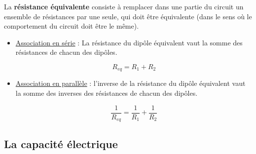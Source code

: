 La \textbf{résistance équivalente} consiste à remplacer dans une partie du circuit un ensemble de résistances par une seule, qui doit être équivalente (dans le sens où le comportement du circuit doit être le même).\\ 

\begin{itemize}
\item \underline{Association en série} : La résistance du dipôle équivalent vaut la somme des résistances de chacun des dipôles. \\

\begin{center}
\begin{minipage}{.2\textwidth}
\begin{center}

\end{center}
\end{minipage}
\hspace{1cm}
\begin{minipage}{.3\textwidth} 
\begin{equation}
	R_{eq} = R_1 + R_2
\end{equation}
\end{minipage}
\end{center}

\vspace{0.5cm}

\item \underline{Association en parallèle} : l'inverse de la résistance du dipôle équivalent vaut la somme des inverses des résistances de chacun des dipôles. \\

\begin{center}
\begin{minipage}{.2\textwidth}
\begin{center}
	
\end{center}
\end{minipage}
\hspace{1cm}
\begin{minipage}{.3\textwidth} 
\begin{equation}
	\dfrac{1}{R_{eq}} = \dfrac{1}{R_1} + \dfrac{1}{R_2} 
\end{equation}
\end{minipage}
\end{center}
\end{itemize}

\subsection{ La capacité électrique }

